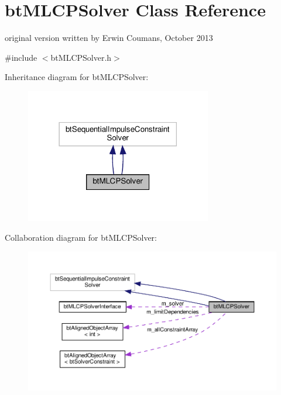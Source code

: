 \hypertarget{classbtMLCPSolver}{}\section{bt\+M\+L\+C\+P\+Solver Class Reference}
\label{classbtMLCPSolver}


original version written by Erwin Coumans, October 2013  




{\ttfamily \#include $<$bt\+M\+L\+C\+P\+Solver.\+h$>$}



Inheritance diagram for bt\+M\+L\+C\+P\+Solver\+:
\nopagebreak
\begin{figure}[H]
\begin{center}
\leavevmode
\includegraphics[width=230pt]{classbtMLCPSolver__inherit__graph}
\end{center}
\end{figure}


Collaboration diagram for bt\+M\+L\+C\+P\+Solver\+:
\nopagebreak
\begin{figure}[H]
\begin{center}
\leavevmode
\includegraphics[width=350pt]{classbtMLCPSolver__coll__graph}
\end{center}
\end{figure}
